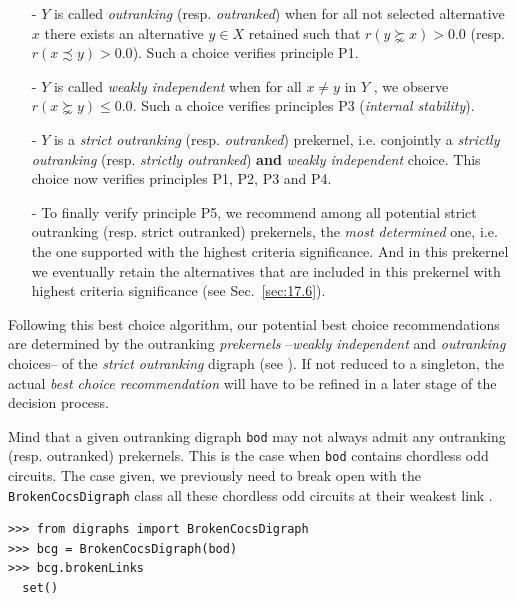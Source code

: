 \begin{itemize}[leftmargin=0.5cm,listparindent=0em]
\item [-] $Y$ is called \emph{outranking} (resp. \emph{outranked}) when for all not selected alternative $x$ there exists an alternative $y \in X$ retained such that $r(y \succnsim x) > 0.0$ (resp. $r(x \precsim y) > 0.0$). Such a choice verifies principle P1.
\item [-] $Y$ is called \emph{weakly independent} when for all $x \neq y$ in $Y$ , we observe $r(x \succnsim y) \leq 0.0$. Such a choice verifies principles P3 (\emph{internal stability}).
\item [-] $Y$ is a \emph{strict outranking} (resp. \emph{outranked}) prekernel, i.e. conjointly a \emph{strictly outranking} (resp. \emph{strictly outranked}) \textbf{and} \emph{weakly independent} choice. This choice now verifies principles P1, P2, P3 and P4.
\item [-] To finally verify principle P5, we recommend among all potential strict outranking (resp. strict outranked) prekernels, the \emph{most determined} one, i.e. the one supported with the highest criteria significance. And in this prekernel we eventually retain the alternatives that are included in this prekernel with highest criteria significance (see Sec.~\ref{sec:17.6}).
\end{itemize}

Following this best choice algorithm, our potential best choice recommendations are determined by the outranking \emph{prekernels} --\emph{weakly independent} and \emph{outranking} choices-- of the \emph{strict outranking} digraph (see \citealp{BIS-2008a}). If not reduced to a singleton, the actual \emph{best choice recommendation} will have to be refined in a later stage of the decision process.

Mind that a given outranking digraph \texttt{bod} may not always admit any outranking (resp. outranked) prekernels. This is the case when \texttt{bod} contains chordless odd circuits. The case given, we previously need to break open with the \texttt{BrokenCocsDigraph} class all these chordless odd circuits at their weakest link \citep{BIS-2021b}.
\begin{lstlisting}
>>> from digraphs import BrokenCocsDigraph
>>> bcg = BrokenCocsDigraph(bod)
>>> bcg.brokenLinks
  set()
\end{lstlisting}

